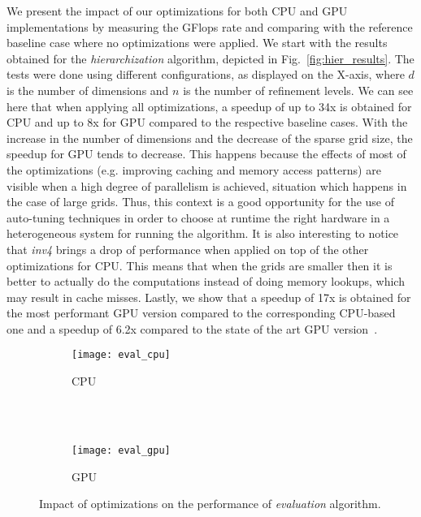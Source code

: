 We present the impact of our optimizations for both CPU and GPU implementations
by measuring the GFlops rate and comparing with the reference baseline case
where no optimizations were applied. We start with the results obtained for the
\textit{hierarchization} algorithm, depicted in Fig.~\ref{fig:hier_results}. The
tests were done using different configurations, as displayed on the X-axis,
where $d$ is the number of dimensions and $n$ is the number of refinement
levels. We can see here that when applying all optimizations, a speedup of up to
34x is obtained for CPU and up to 8x for GPU compared to the respective baseline
cases. With the increase in the number of dimensions and the decrease of the
sparse grid size, the speedup for GPU tends to decrease. This happens because
the effects of most of the optimizations (e.g. improving caching and memory
access patterns) are visible when a high degree of parallelism is achieved,
situation which happens in the case of large grids. Thus, this context is a good
opportunity for the use of auto-tuning techniques in order to choose at runtime
the right hardware in a heterogeneous system for running the algorithm. It is
also interesting to notice that \textit{inv4} brings a drop of performance when
applied on top of the other optimizations for CPU. This means that when the
grids are smaller then it is better to actually do the computations instead of
doing memory lookups, which may result in cache misses. Lastly, we show that a
speedup of 17x is obtained for the most performant GPU version compared to the
corresponding CPU-based one and a speedup of 6.2x compared to the state of the
art GPU version~\cite{Murarasu:2011:CDS:1941553.1941559}.

\begin{figure}[t]
  \begin{subfigure}[b]{1\linewidth}
    \centering
    \texttt{[image: eval\_cpu]} \\
    \caption{CPU}
  \end{subfigure}
  \\ \\
  \begin{subfigure}[b]{1\linewidth}
    \centering
    \texttt{[image: eval\_gpu]}
    \caption{GPU}
  \end{subfigure}
  \caption{Impact of optimizations on the performance of \textit{evaluation} algorithm.}
  \label{fig:eval_results}
\end{figure}

